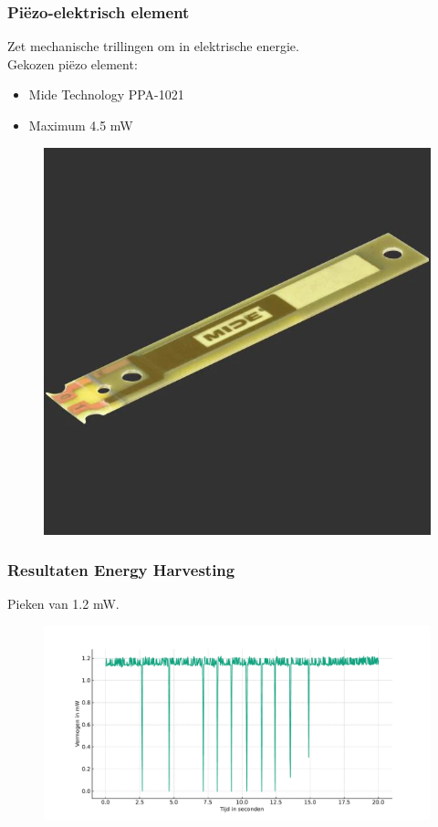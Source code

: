     \begin{frame}
        \frametitle{Piëzo-elektrisch element}
    
        Zet mechanische trillingen om in elektrische energie.\\
        Gekozen piëzo element:
        \begin{itemize}
            \item Mide Technology PPA-1021 
            \item Maximum 4.5 mW
        \end{itemize}
        \begin{figure}[h]
            \raggedleft
            \includegraphics[scale=0.2]{img/peizo.png}
        \end{figure}

    \end{frame}

    \begin{frame}
        \frametitle{Resultaten Energy Harvesting}
        Pieken van 1.2 mW.
        \begin{figure}[h]
            \raggedright
            \includegraphics[scale=0.40]{img/resultaten_piezo.pdf}
        \end{figure}
    \end{frame}


